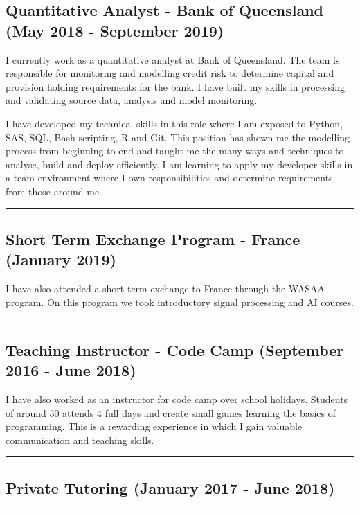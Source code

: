 \subsection*{Quantitative Analyst - Bank of Queensland (May 2018 - September 2019)}
I currently work as a quantitative analyst at Bank of Queensland. The team is responsible for monitoring and modelling credit risk to determine capital and provision holding requirements for the bank. I have built my skills in processing and validating source data, analysis and model monitoring. 

I have developed my technical skills in this role where I am exposed to Python, SAS, SQL, Bash scripting, R and Git. This position has shown me the modelling process from beginning to end and taught me the many ways and techniques to analyse, build and deploy efficiently. I am learning to apply my developer skills in a team environment where I own responsibilities and determine requirements from those around me. 

\noindent\rule{\textwidth}{0.5pt}

\subsection*{Short Term Exchange Program - France (January 2019)}

I have also attended a short-term exchange to France through the WASAA program. On this program we took introductory signal processing and AI courses.  

\noindent\rule{\textwidth}{0.5pt}

\subsection*{Teaching Instructor - Code Camp (September 2016 - June 2018)}
I have also worked as an instructor for code camp over school holidays. Students of around 30 attends 4 full days and create small games learning the basics of programming. This is a rewarding experience in which I gain valuable communication and teaching skills. 

\noindent\rule{\textwidth}{0.5pt}

\subsection*{Private Tutoring (January 2017 - June 2018)}

\noindent\rule{\textwidth}{0.5pt}

